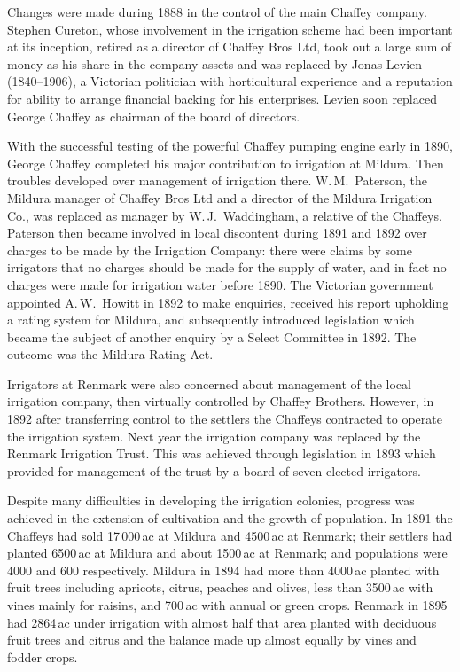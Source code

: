 Changes were made during 1888 in the control of the main Chaffey
company.  Stephen Cureton, whose involvement in the irrigation scheme
had been important at its inception, retired as a director of Chaffey
Bros Ltd, took out a large sum of money as his share in the company
assets and was replaced by Jonas Levien (1840--1906), a Victorian
politician with horticultural experience and a reputation for ability
to arrange financial backing for his enterprises.  Levien soon
replaced George Chaffey as chairman of the board of directors.

With the successful testing of the powerful Chaffey pumping engine
early in 1890, George Chaffey completed his major contribution to
irrigation at Mildura.  Then troubles developed over management of
irrigation there.  W.\,M.~Paterson, the Mildura manager of Chaffey
Bros Ltd and a director of the Mildura Irrigation Co., was replaced as
manager by W.\,J.~Waddingham, a relative of the Chaffeys.  Paterson then became involved in local
discontent during 1891 and 1892 over charges to be made by the
Irrigation Company: there were claims by some irrigators that no
charges should be made for the supply of water, and in fact no charges
were made for irrigation water before 1890.  The Victorian government
appointed A.\,W.~Howitt in 1892 to make enquiries, received his report
upholding a rating system for Mildura, and subsequently introduced
legislation which became the subject of another enquiry by a Select
Committee in 1892.  The outcome was the Mildura Rating Act.

Irrigators at Renmark were also concerned about management of the
local irrigation company, then virtually controlled by Chaffey
Brothers.  However, in 1892 after transferring control to the settlers
the Chaffeys contracted to operate the irrigation system.  Next year
the irrigation company was replaced by the Renmark Irrigation Trust.
This was achieved through legislation in 1893 which provided for
management of the trust by a board of seven elected
irrigators.

Despite many difficulties in developing the irrigation colonies,
progress was achieved in the extension of cultivation and the growth
of population.  In 1891 the Chaffeys had sold 17\,000\,ac at Mildura
and 4500\,ac at Renmark; their settlers had planted 6500\,ac at
Mildura and about 1500\,ac at Renmark; and populations were 4000
and 600 respectively.  Mildura in 1894 had more than 4000\,ac
planted with fruit trees including apricots, citrus, peaches and
olives, less than 3500\,ac with vines mainly for raisins, and
700\,ac with annual or green crops.  Renmark in 1895
had 2864\,ac under irrigation with almost half that area planted
with deciduous fruit trees and citrus and the balance made up almost
equally by vines and fodder crops.

